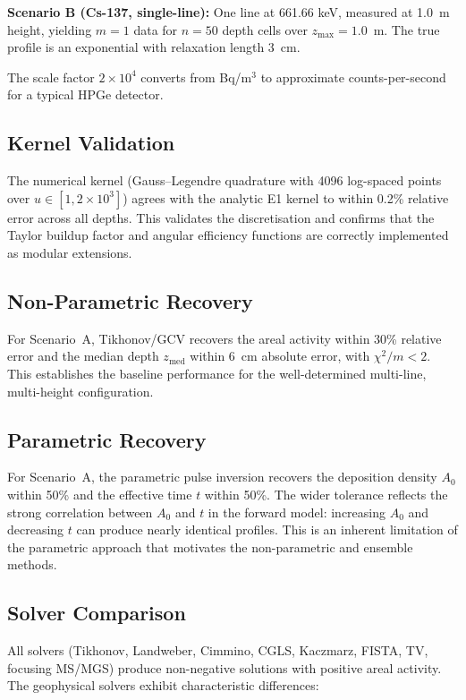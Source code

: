 \documentclass[a4paper,11pt]{article}
\begin{document}
\textbf{Scenario B (Cs-137, single-line):} One line at 661.66 keV,
measured at 1.0~m height, yielding $m = 1$ data for $n = 50$ depth
cells over $z_{\max} = 1.0$~m.  The true profile is an exponential
with relaxation length 3~cm.

The scale factor $2 \times 10^4$ converts from Bq/m$^3$ to approximate
counts-per-second for a typical HPGe detector.

\subsection{Kernel Validation}

The numerical kernel (Gauss--Legendre quadrature with 4096 log-spaced
points over $u \in [1, 2\times 10^3]$) agrees with the analytic E1 kernel
to within 0.2\% relative error across all depths.  This validates the
discretisation and confirms that the Taylor buildup factor and angular
efficiency functions are correctly implemented as modular extensions.

\subsection{Non-Parametric Recovery}

For Scenario~A, Tikhonov/GCV recovers the areal activity within 30\%
relative error and the median depth $z_{\mathrm{med}}$ within 6~cm absolute
error, with $\chi^2/m < 2$.  This establishes the baseline performance
for the well-determined multi-line, multi-height configuration.

\subsection{Parametric Recovery}

For Scenario~A, the parametric pulse inversion recovers the deposition
density $A_0$ within 50\% and the effective time $t$ within 50\%.  The
wider tolerance reflects the strong correlation between $A_0$ and $t$
in the forward model: increasing $A_0$ and decreasing $t$ can produce
nearly identical profiles.  This is an inherent limitation of the
parametric approach that motivates the non-parametric and ensemble
methods.

\subsection{Solver Comparison}

All solvers (Tikhonov, Landweber, Cimmino, CGLS, Kaczmarz, FISTA, TV,
focusing MS/MGS) produce non-negative solutions with positive areal
activity.  The geophysical solvers exhibit characteristic differences:
\end{document}
